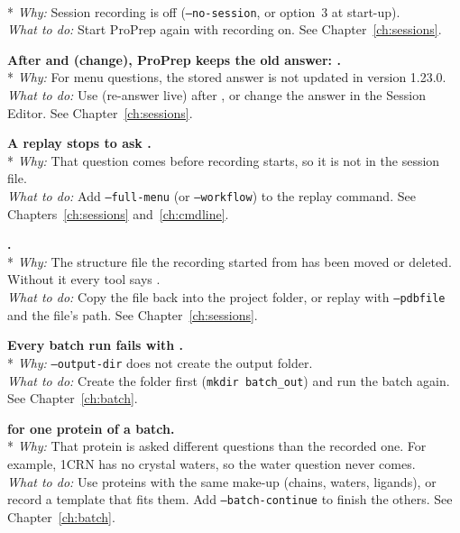 {\bfseries {}}\\*
\emph{Why:} Session recording is off (\texttt{--no-session}, or option~3 at
start-up).\\
\emph{What to do:} Start ProPrep again with recording on. See
Chapter~\ref{ch:sessions}.

{\bfseries After  and  (change), ProPrep keeps the old
answer: .}\\*
\emph{Why:} For menu questions, the stored answer is not updated in version
1.23.0.\\
\emph{What to do:} Use  (re-answer live) after , or change
the answer in the Session Editor. See Chapter~\ref{ch:sessions}.

{\bfseries A replay stops to ask .}\\*
\emph{Why:} That question comes before recording starts, so it is not in the
session file.\\
\emph{What to do:} Add \texttt{--full-menu} (or \texttt{--workflow}) to the
replay command. See Chapters~\ref{ch:sessions} and~\ref{ch:cmdline}.

{\bfseries {}.}\\*
\emph{Why:} The structure file the recording started from has been moved or
deleted. Without it every tool says .\\
\emph{What to do:} Copy the file back into the project folder, or replay with
\texttt{--pdbfile} and the file's path. See Chapter~\ref{ch:sessions}.

{\bfseries Every batch run fails with .}\\*
\emph{Why:} \texttt{--output-dir} does not create the output folder.\\
\emph{What to do:} Create the folder first (\texttt{mkdir batch\_out}) and
run the batch again. See Chapter~\ref{ch:batch}.

{\bfseries {} for one
protein of a batch.}\\*
\emph{Why:} That protein is asked different questions than the recorded one.
For example, 1CRN has no crystal waters, so the water question never comes.\\
\emph{What to do:} Use proteins with the same make-up (chains, waters,
ligands), or record a template that fits them. Add \texttt{--batch-continue}
to finish the others. See Chapter~\ref{ch:batch}.

